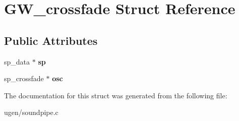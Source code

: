 \hypertarget{structGW__crossfade}{}\section{G\+W\+\_\+crossfade Struct Reference}
\label{structGW__crossfade}
\subsection*{Public Attributes}
\begin{DoxyCompactItemize}
\item 
\hypertarget{structGW__crossfade_ae8676d94c696791408467c2f490f1085}{}\label{structGW__crossfade_ae8676d94c696791408467c2f490f1085} 
sp\+\_\+data $\ast$ {\bfseries sp}
\item 
\hypertarget{structGW__crossfade_adf46cc9b59866cfbeddb17aeab2f176f}{}\label{structGW__crossfade_adf46cc9b59866cfbeddb17aeab2f176f} 
sp\+\_\+crossfade $\ast$ {\bfseries osc}
\end{DoxyCompactItemize}


The documentation for this struct was generated from the following file\+:\begin{DoxyCompactItemize}
\item 
ugen/soundpipe.\+c\end{DoxyCompactItemize}
